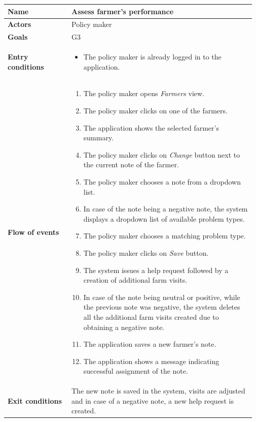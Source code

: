 \begin{longtable}{@{}p{0.25\linewidth} p{0.72\linewidth}@{}}
\toprule
		\textbf{Name}               & Assess farmer's performance\\
		\midrule
		\textbf{Actors}             & Policy maker\\
		\midrule
		\textbf{Goals}              & G3 \\
		\midrule
		
		\textbf{Entry conditions}   & \begin{itemize}[leftmargin=.4cm,noitemsep,topsep=0pt,before=\vspace{-3mm},after=\vspace{-4mm}]
		    \item The policy maker is already logged in to the application.
		\end{itemize}\\
		\midrule
		
		\textbf{Flow of events}     & \begin{enumerate}[leftmargin=.4cm,noitemsep,topsep=0pt,before=\vspace{-3mm},after=\vspace{-4mm}]
		    \item The policy maker opens \textit{Farmers} view.
		    \item The policy maker clicks on one of the farmers.
		    \item The application shows the selected farmer's summary.
		    \item The policy maker clicks on \textit{Change} button next to the current note of the farmer.
		    \item The policy maker chooses a note from a dropdown list.
		    \item In case of the note being a negative note, the system displays a dropdown list of available problem types.
		    \item The policy maker chooses a matching problem type.
		    \item The policy maker clicks on \textit{Save} button.
		    \item The system issues a help request followed by a creation of additional farm visits.
		    \item In case of the note being neutral or positive, while the previous note was negative, the system deletes all the additional farm visits created due to obtaining a negative note.
		    \item The application saves a new farmer's note.
		    \item The application shows a message indicating successful assignment of the note.
		\end{enumerate}\\
		\midrule
		\textbf{Exit conditions}    & The new note is saved in the system, visits are adjusted and in case of a negative note, a new help request is created.  \\
		\midrule
		

\end{longtable}
